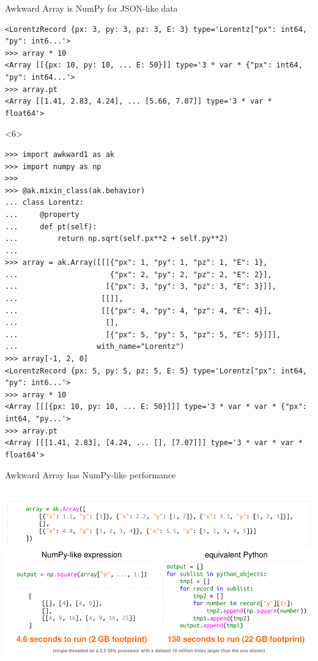 \documentclass[aspectratio=169]{beamer}
\begin{document}
\begin{frame}[fragile]{Awkward Array is NumPy for JSON-like data}
\begin{onlyenv}
\begin{verbatim}
<LorentzRecord {px: 3, py: 3, pz: 3, E: 3} type='Lorentz["px": int64, "py": int6...'>
>>> array * 10
<Array [[{px: 10, py: 10, ... E: 50}]] type='3 * var * {"px": int64, "py": int64...'>
>>> array.pt
<Array [[1.41, 2.83, 4.24], ... [5.66, 7.07]] type='3 * var * float64'>
\end{verbatim}
\vspace{3 cm}
\end{onlyenv}
\begin{onlyenv}<6>
\begin{verbatim}
>>> import awkward1 as ak
>>> import numpy as np
>>> 
>>> @ak.mixin_class(ak.behavior)
... class Lorentz:
...     @property
...     def pt(self):
...         return np.sqrt(self.px**2 + self.py**2)
... 
>>> array = ak.Array([[[{"px": 1, "py": 1, "pz": 1, "E": 1},
...                     {"px": 2, "py": 2, "pz": 2, "E": 2}],
...                    [{"px": 3, "py": 3, "pz": 3, "E": 3}]],
...                   [[]],
...                   [[{"px": 4, "py": 4, "pz": 4, "E": 4}],
...                    [],
...                    [{"px": 5, "py": 5, "pz": 5, "E": 5}]]],
...                  with_name="Lorentz")
>>> array[-1, 2, 0]
<LorentzRecord {px: 5, py: 5, pz: 5, E: 5} type='Lorentz["px": int64, "py": int6...'>
>>> array * 10
<Array [[[{px: 10, py: 10, ... E: 50}]]] type='3 * var * var * {"px": int64, "py...'>
>>> array.pt
<Array [[[1.41, 2.83], [4.24, ... [], [7.07]]] type='3 * var * var * float64'>
\end{verbatim}
\vspace{3 cm}
\end{onlyenv}
\end{frame}

\begin{frame}{Awkward Array has NumPy-like performance}
\vspace{0.2 cm}
\begin{columns}
\includegraphics[width=\linewidth]{pivarski-one-slide-summary.pdf}
\end{columns}
\end{frame}
\end{document}
